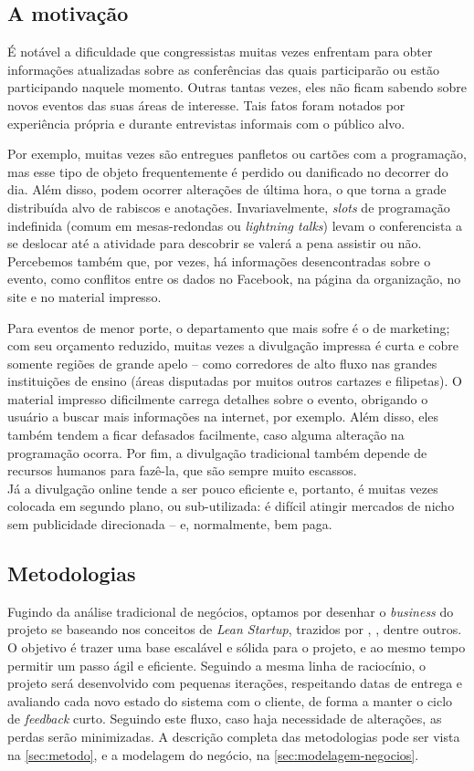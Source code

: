 \documentclass[12pt,a4paper,twoside,hyphens,english,brazil]{abntex2}
\begin{document}
\subsection{A motivação}
É notável a dificuldade que congressistas muitas vezes enfrentam para obter informações atualizadas sobre as conferências das quais participarão ou estão participando naquele momento. Outras tantas vezes, eles não ficam sabendo sobre novos eventos das suas áreas de interesse. Tais fatos foram notados por experiência própria e durante entrevistas informais com o público alvo.

Por exemplo, muitas vezes são entregues panfletos ou cartões com a programação, mas esse tipo de objeto frequentemente é perdido ou danificado no decorrer do dia. Além disso, podem ocorrer alterações de última hora, o que torna a grade distribuída alvo de rabiscos e anotações. Invariavelmente, \emph{slots} de programação indefinida (comum em mesas-redondas ou \emph{lightning talks}\footnotemark) levam o conferencista a se deslocar até a atividade para descobrir se valerá a pena assistir ou não. Percebemos também que, por vezes, há informações desencontradas sobre o evento, como conflitos entre os dados no Facebook, na página da organização, no site e no material impresso.

Para eventos de menor porte, o departamento que mais sofre é o de marketing; com seu orçamento reduzido, muitas vezes a divulgação impressa é curta e cobre somente regiões de grande apelo -- como corredores de alto fluxo nas grandes instituições de ensino (áreas disputadas por muitos outros cartazes e filipetas). O material impresso dificilmente carrega detalhes sobre o evento, obrigando o usuário a buscar mais informações na internet, por exemplo. Além disso, eles também tendem a ficar defasados facilmente, caso alguma alteração na programação ocorra. Por fim, a divulgação tradicional também depende de recursos humanos para fazê-la, que são sempre muito escassos.\\
Já a divulgação online tende a ser pouco eficiente e, portanto, é muitas vezes colocada em segundo plano, ou sub-utilizada: é difícil atingir mercados de nicho sem publicidade direcionada -- e, normalmente, bem paga.

\subsection{Metodologias}
Fugindo da análise tradicional de negócios, optamos por desenhar o \emph{business} do projeto se baseando nos conceitos de \emph{Lean Startup}, trazidos por \citeauthor{manual-startup}\cite{whats-startup}, \citeauthor{lean-startup}\cite{five-whys}, \citeauthor{lean-canvas} dentre outros. O objetivo é trazer uma base escalável e sólida para o projeto, e ao mesmo tempo permitir um passo ágil e eficiente. Seguindo a mesma linha de raciocínio, o projeto será desenvolvido com pequenas iterações, respeitando datas de entrega e avaliando cada novo estado do sistema com o cliente, de forma a manter o ciclo de \emph{feedback} curto. Seguindo este fluxo, caso haja necessidade de alterações, as perdas serão minimizadas. A descrição completa das metodologias pode ser vista na \autoref{sec:metodo}, e a modelagem do negócio, na \autoref{sec:modelagem-negocios}.
\end{document}
